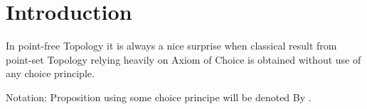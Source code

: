 \chapter{Introduction}
\cite{picado2011frames}

In point-free Topology it is always a nice surprise when classical result from point-set Topology relying heavily on Axiom of Choice is obtained without use of any choice principle.


Notation: Proposition using some choice principe will be denoted By \ACP.

